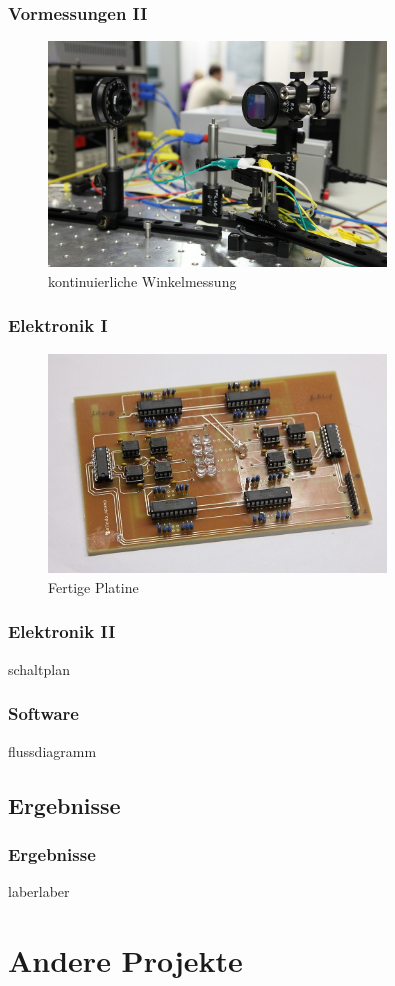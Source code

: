 \documentclass[10pt]{beamer}
\begin{document}
{
\frametitle{Vormessungen II}
\begin{figure}
\begin{center}
\includegraphics[width=0.8\textwidth]{./images/prIMG_7244}
\caption{kontinuierliche Winkelmessung}
\end{center}
\end{figure}
}
\frame
{
\frametitle{Elektronik I}
\begin{figure}
\begin{center}
\includegraphics[width=0.8\textwidth]{./images/prIMG_7253crop.jpg}
\caption{Fertige Platine}
\end{center}
\end{figure}
}
\frame
{
\frametitle{Elektronik II}
schaltplan
}
\frame
{
\frametitle{Software}
flussdiagramm
}
\subsection[]{Ergebnisse}
\frame
{
\frametitle{Ergebnisse}
laberlaber
}

\section{Andere Projekte}
\end{document}
